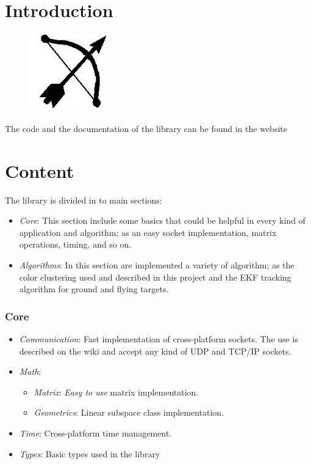 \section{Introduction}
	\begin{figure}
		\includegraphics[width=0.3\textwidth]{../Images/c6/BOVIL.jpg}
		\label{fig:bovil}
	\end{figure}

	The code and the documentation of the library can be found in the website \cite{BOViL}
	
\section{Content}
	The library is divided in to main sections:
	\begin{itemize}
		\item \textit{Core}: This section include some basics that could be helpful in every kind of application and algorithm; as an easy socket implementation, matrix operations, timing, and so on.
		\item \textit{Algorithms}: In this section are implemented a variety of algorithm; as the color clustering used and described in this project and the EKF tracking algorithm for ground and flying targets.
	\end{itemize}
	
	\subsubsection{Core}
		\begin{itemize}
			\item \textit{Communication}: Fast implementation of cross-platform sockets. The use is described on the wiki and accept any kind of UDP and TCP/IP sockets.
			\item \textit{Math}:
				\begin{itemize}
					\item \textit{Matrix}: \textit{Easy to use} matrix implementation.
					\item \textit{Geometrics}: Linear subspace class implementation.
				\end{itemize}
			\item \textit{Time}: Cross-platform time management.
			\item \textit{Types}: Basic types used in the library
		\end{itemize}
		
